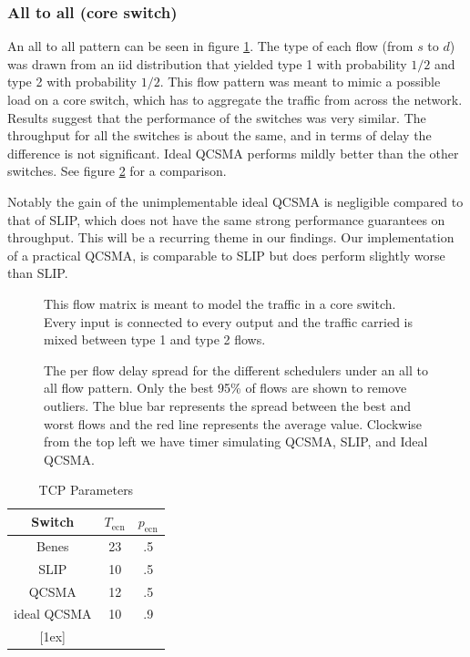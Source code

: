 \documentclass{IEEEtran}%
\begin{document}
\subsubsection{All to all (core switch)}
An all to all pattern can be seen in figure \ref{all_to_all}.  The type of each flow (from $s$ to $d$) was drawn from an iid distribution that yielded type 1 with probability $1/2$ and type 2 with probability $1/2$.  This flow pattern was meant to mimic a possible load on a core switch, which has to aggregate the traffic from across the network.  Results suggest that the performance of the switches was very similar.  The throughput for all the switches is about the same, and in terms of delay the difference is not significant. Ideal QCSMA performs mildly better than the other switches.  See figure \ref{all_to_all_delay} for a comparison.

Notably the gain of the unimplementable ideal QCSMA is negligible compared to that of SLIP, which does not have the same strong performance guarantees on throughput.  This will be a recurring theme in our findings.  Our implementation of a practical QCSMA, is comparable to SLIP but does perform slightly worse than SLIP.

\begin{figure}%
	\caption{This flow matrix is meant to model the traffic in a core switch.  Every input is connected to every output and the traffic carried is mixed between type 1 and type 2 flows.}
	\label{all_to_all}
\end{figure}

\begin{figure}%
	\caption{The per flow delay spread for the different schedulers under an all to all flow pattern.  Only the best 95\% of flows are shown to remove outliers.  The blue bar represents the spread between the best and worst flows and the red line represents the average value.  Clockwise from the top left we have timer simulating QCSMA, SLIP, and Ideal QCSMA.}
	\label{all_to_all_delay}
\end{figure}

\begin{table}[ht] \caption{TCP Parameters} 
\centering 
\begin{tabular}{c c c}
 \hline\hline 
 Switch & $T_{\text{ecn}}$ & $p_{\text{ecn}}$ \\
  [0.5ex] \hline 
  Benes&23&.5 \\
 SLIP&10&.5 \\
  QCSMA&12&.5  \\
   ideal  QCSMA&10&.9  \\
  [1ex] \hline 
  \end{tabular}
   \label{ecn_table} 
\end{table}
\end{document}
